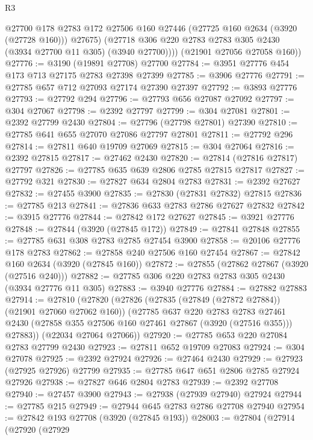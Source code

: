 \begin{lexlean}{R3}
\begin{coremodule}
            @27700
            @178
            @2783
            @172
            @27506
            @160
            @27446
            (@27725 @160 @2634 (@3920 (@27728 @160)))
            @27675)
          (@27718 @306 @220 @2783 @2783 @305 @2430 (@3934 @27700 @11 @305) (@3940 @27700))))
      (@21901 @27056 @27058 @160))
@27776 := @3190 (@19891 @27708) @27700
@27784 := @3951 @27776 @454 @173 @713 @27175 @2783 @27398 @27399
@27785 := @3906 @27776
@27791 := @27785 @657 @712 @27093 @27174 @27390 @27397
@27792 := @3893 @27776
@27793 := @27792 @294
@27796 := @27793 @656 @27087 @27092
@27797 := @304 @27067
@27798 := @2392 @27797
@27799 := @304 @27081
@27801 := @2392 @27799 @2430
@27804 := @27796 (@27798 @27801) @27390
@27810 := @27785 @641 @655 @27070 @27086 @27797 @27801
@27811 := @27792 @296
@27814 := @27811 @640 @19709 @27069
@27815 := @304 @27064
@27816 := @2392 @27815
@27817 := @27462 @2430
@27820 := @27814 (@27816 @27817) @27797
@27826 := @27785 @635 @639 @2806 @2785 @27815 @27817
@27827 := @27792 @321
@27830 := @27827 @634 @2804 @2783
@27831 := @2392 @27627
@27832 := @27455 @3900
@27835 := @27830 (@27831 @27832) @27815
@27836 := @27785 @213
@27841 := @27836 @633 @2783 @2786 @27627 @27832
@27842 := @3915 @27776
@27844 := @27842 @172 @27627
@27845 := @3921 @27776
@27848 := @27844 (@3920 (@27845 @172))
@27849 := @27841 @27848
@27855 := @27785 @631 @308 @2783 @2785 @27454 @3900
@27858 := @20106 @27776 @178 @2783
@27862 := @27858 @240 @27506 @160 @27454
@27867 := @27842 @160 @2634 (@3920 (@27845 @160))
@27872 := @27855 (@27862 @27867 (@3920 (@27516 @240)))
@27882 := @27785 @306 @220 @2783 @2783 @305 @2430 (@3934 @27776 @11 @305)
@27883 := @3940 @27776
@27884 := @27882 @27883
@27914 := @27810
    (@27820
      (@27826
        (@27835 (@27849 (@27872 @27884)) (@21901 @27060 @27062 @160))
        (@27785
          @637
          @220
          @2783
          @2783
          @27461
          @2430
          (@27858 @355 @27506 @160 @27461 @27867 (@3920 (@27516 @355)))
          @27883))
      (@22034 @27064 @27066))
@27920 := @27785 @653 @220 @27084 @2783 @27799 @2430
@27923 := @27811 @652 @19709 @27083
@27924 := @304 @27078
@27925 := @2392 @27924
@27926 := @27464 @2430
@27929 := @27923 (@27925 @27926) @27799
@27935 := @27785 @647 @651 @2806 @2785 @27924 @27926
@27938 := @27827 @646 @2804 @2783
@27939 := @2392 @27708
@27940 := @27457 @3900
@27943 := @27938 (@27939 @27940) @27924
@27944 := @27785 @215
@27949 := @27944 @645 @2783 @2786 @27708 @27940
@27954 := @27842 @193 @27708 (@3920 (@27845 @193))
@28003 := @27804
    (@27914
      (@27920
        (@27929

\end{coremodule}
\end{lexlean}
